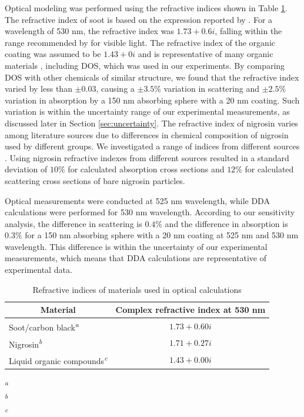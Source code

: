 Optical modeling was performed using the refractive indices shown in Table \ref{tab:refindices}. The refractive index of soot is based on the expression reported by \citet{RN23}. For a wavelength of 530 nm, the refractive index was $1.73+0.6i$, falling within the range recommended by \citet{RN34} for visible light. The refractive index of the organic coating was assumed to be $1.43+0i$ and is representative of many organic materials \citep{crchandbook}, including DOS, which was used in our experiments. By comparing DOS with other chemicals of similar structure, we found that the refractive index varied by less than  $\pm0.03$, causing a $\pm 3.5\%$ variation in scattering and $\pm 2.5\%$ variation in absorption by a 150 nm absorbing sphere with a 20 nm coating. Such variation is within the uncertainty range of our experimental measurements, as discussed later in Section \ref{sec:uncertainty}. The refractive index of nigrosin varies among literature sources due to differences in chemical composition of nigrosin used by different groups. We investigated a range of indices from different sources \citep{RN15,lack2006aerosol,bluvshtein2012approach,dinar2008complex,flores2014complex}. Using nigrosin refractive indexes from different sources resulted in a standard deviation of $10\%$ for calculated absorption cross sections and $12\%$ for calculated scattering cross sections of bare nigrosin particles.

Optical measurements were conducted at 525 nm wavelength, while DDA calculations were performed for 530 nm wavelength. According to our sensitivity analysis, the difference in scattering is $0.4 \%$ and the difference in absorption is $0.3 \%$ for a 150 nm absorbing sphere with a 20 nm coating at 525 nm and 530 nm wavelength. This difference is within the uncertainty of our experimental measurements, which means that DDA calculations are representative of experimental data.

\begin{table}[ht]
\caption{Refractive indices of materials used in optical calculations}
\label{tab:refindices}
\begin{center}
\begin{tabular}{l c}
 \hline
 \multicolumn{1}{c}{Material} & Complex refractive index at 530 nm \\
 \hline
 Soot/carbon black\textsuperscript{\textit{a}} & $1.73+0.60i$\\
 Nigrosin\textsuperscript{\textit{b}} & $1.71+0.27i$\\
 Liquid organic compounds\textsuperscript{\textit{c}} & $1.43+0.00i$\\
 \hline
\end{tabular}
\end{center}

\textsuperscript{\textit{a}}\citet{RN23}\\
\textsuperscript{\textit{b}}\citet{RN15}\\
\textsuperscript{\textit{c}}\citet{RN22}
\end{table}

